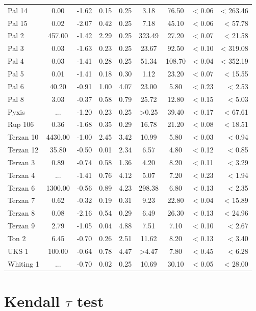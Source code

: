 \documentclass[doublespace,draft,nopageskip]{VTthesis} %
\begin{document}
\begin{appendices}
\begin{table}
\begin{tabular}{lcccccccr}
Pal 14 & 0.00 & -1.62 & 0.15 & 0.25 & 3.18 & 76.50 & < 0.06 & < 263.46\\
Pal 15 & 0.02 & -2.07 & 0.42 & 0.25 & 7.18 & 45.10 & < 0.06 & < 57.78\\
Pal 2 & 457.00 & -1.42 & 2.29 & 0.25 & 323.49 & 27.20 & < 0.07 & < 21.58\\
Pal 3 & 0.03 & -1.63 & 0.23 & 0.25 & 23.67 & 92.50 & < 0.10 & < 319.08\\
Pal 4 & 0.03 & -1.41 & 0.28 & 0.25 & 51.34 & 108.70 & < 0.04 & < 352.19\\
Pal 5 & 0.01 & -1.41 & 0.18 & 0.30 & 1.12 & 23.20 & < 0.07 & < 15.55\\
Pal 6 & 40.20 & -0.91 & 1.00 & 4.07 & 23.00 & 5.80 & < 0.23 & < 2.53\\
Pal 8 & 3.03 & -0.37 & 0.58 & 0.79 & 25.72 & 12.80 & < 0.15 & < 5.03\\
Pyxis & ... & -1.20 & 0.23 & 0.25 & >0.25 & 39.40 & < 0.17 & < 67.61\\
Rup 106 & 0.36 & -1.68 & 0.35 & 0.29 & 16.78 & 21.20 & < 0.08 & < 18.51\\
Terzan 10 & 4430.00 & -1.00 & 2.45 & 3.42 & 10.99 & 5.80 & < 0.03 & < 0.94\\
Terzan 12 & 35.80 & -0.50 & 0.01 & 2.34 & 6.57 & 4.80 & < 0.12 & < 0.85\\
Terzan 3 & 0.89 & -0.74 & 0.58 & 1.36 & 4.20 & 8.20 & < 0.11 & < 3.29\\
Terzan 4 & ... & -1.41 & 0.76 & 4.12 & 5.07 & 7.20 & < 0.23 & < 1.94\\
Terzan 6 & 1300.00 & -0.56 & 0.89 & 4.23 & 298.38 & 6.80 & < 0.13 & < 2.35\\
Terzan 7 & 0.62 & -0.32 & 0.19 & 0.31 & 9.23 & 22.80 & < 0.04 & < 15.89\\
Terzan 8 & 0.08 & -2.16 & 0.54 & 0.29 & 6.49 & 26.30 & < 0.13 & < 24.96\\
Terzan 9 & 2.79 & -1.05 & 0.04 & 4.88 & 7.51 & 7.10 & < 0.10 & < 2.67\\
Ton 2 & 6.45 & -0.70 & 0.26 & 2.51 & 11.62 & 8.20 & < 0.13 & < 3.40\\
UKS 1 & 100.00 & -0.64 & 0.78 & 4.47 & >4.47 & 7.80 & < 0.45 & < 6.28\\
Whiting 1 & ... & -0.70 & 0.02 & 0.25 & 10.69 & 30.10 & < 0.05 & < 28.00\\
\hline
\end{tabular}
\end{table}

\clearpage

\section{Kendall $\tau$ test}\label{appx:MC}


\end{appendices}
\end{document}

